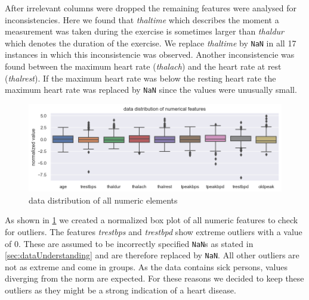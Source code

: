 After irrelevant columns were dropped the remaining features were analysed for inconsistencies. Here we found that \textit{thaltime} which describes the moment a measurement was taken during the exercise is sometimes larger than \textit{thaldur} which denotes the duration of the exercise. We replace \textit{thaltime} by \texttt{NaN} in all 17 instances in which this inconsistencie was observed. Another inconsistencie was found between the maximum heart rate (\textit{thalach}) and the heart rate at rest (\textit{thalrest}). If the maximum heart rate was below the resting heart rate the maximum heart rate was replaced by \texttt{NaN} since the values were unusually small.

\begin{figure}[h]
	\centering
	\includegraphics[width=\textwidth]{images/dataDistribution.png}
	\caption{data distribution of all numeric elements}
	\label{fig:dataDistribution}
\end{figure}
As shown in \cref{fig:dataDistribution} we created a normalized box plot of all numeric features to check for outliers. The features \textit{trestbps} and \textit{trestbpd} show extreme outliers with a value of 0. These are assumed to be incorrectly specified \texttt{NaN}s as stated in \cref{sec:dataUnderstanding} and are therefore replaced by \texttt{NaN}. All other outliers are not as extreme and come in groups. As the data contains sick persons, values diverging from the norm are expected. For these reasons we decided to keep these outliers as they might be a strong indication of a heart disease.

